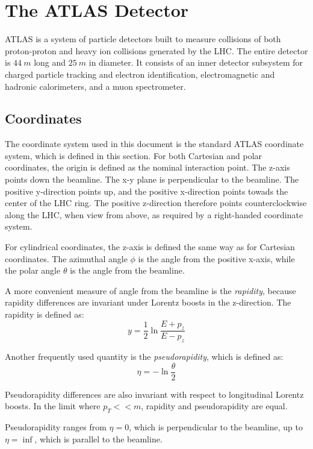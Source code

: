 \chapter{The ATLAS Detector} \label{chapter-atlas}

ATLAS is a system of particle detectors built to
measure collisions of both proton-proton and heavy ion collisions
generated by the LHC. \cite{atlas-detector-2008} The entire detector
is $44~m$ long and $25~m$ in diameter. It consists of an inner
detector subsystem for charged particle tracking and electron
identification, electromagnetic and hadronic calorimeters, and a
muon spectrometer.

\section{Coordinates}
The coordinate system used in this document is the standard ATLAS
coordinate system, which is defined in this section. For both Cartesian and
polar coordinates, the origin is defined as the nominal interaction
point. The z-axis points down the beamline. The x-y plane is
perpendicular to the beamline. The positive y-direction points up, and
the positive x-direction points towads the center of the LHC ring. The
positive z-direction therefore points counterclockwise along the LHC,
when view from above, as required by a right-handed coordinate system.

For cylindrical coordinates, the z-axis is defined the same way as for
Cartesian coordinates. The azimuthal angle $\phi$ is the angle
from the positive x-axis, while the polar angle $\theta$ is the angle
from the beamline.

A more convenient measure of angle from the beamline is the
\textit{rapidity}, because rapidity differences are invariant under Lorentz boosts in the
z-direction. The rapidity is defined as:
\begin{equation}
y = \frac{1}{2}\ln\frac{E+p_z}{E-p_z}
\end{equation}

Another frequently used quantity is the
\textit{pseudorapidity}, which is defined as:
\begin{equation}
\eta = -\ln\frac{\theta}{2}
\end{equation}

Pseudorapidity differences are also invariant with respect to
longitudinal Lorentz boosts. In the limit where $p_T << m$, rapidity and
pseudorapidity are equal.

Pseudorapidity ranges from $\eta=0$, which is perpendicular to the
beamline, up to $\eta=\inf$, which is parallel to the beamline.

